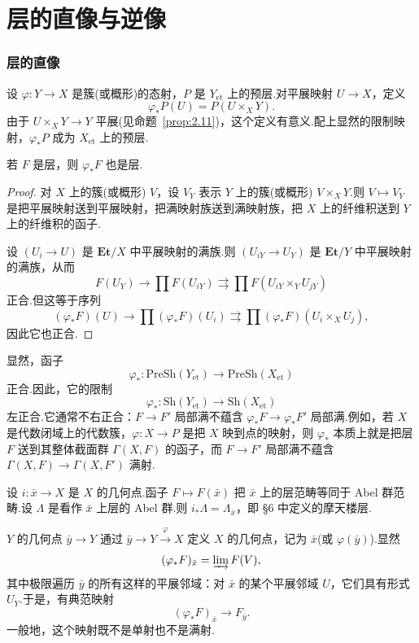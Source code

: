 ﻿%
\chapter{层的直像与逆像}\label{sec:8}

\subsection*{层的直像}

设 $\varphi \colon Y \to X$ 是簇(或概形)的态射，$P$ 是 $Y_{\mathrm{et}}$ 上的预层.对平展映射 $U \to X$，定义
\[
\varphi_{*}P(U) = P(U \times_{X} Y).
\]
由于 $U \times_{X} Y \to Y$ 平展(见命题~\ref{prop:2.11})，这个定义有意义.配上显然的限制映射，$\varphi_{*}P$ 成为 $X_{\mathrm{et}}$ 上的预层.

\begin{lemma}\label{lem:8.1}
若 $F$ 是层，则 $\varphi_{*}F$ 也是层.
\end{lemma}

\begin{proof}
对 $X$ 上的簇(或概形) $V$，设 $V_Y$ 表示 $Y$ 上的簇(或概形) $V \times_{X} Y$.则 $V \mapsto V_Y$ 是把平展映射送到平展映射，把满映射族送到满映射族，把 $X$ 上的纤维积送到 $Y$ 上的纤维积的函子.

设 $(U_i \to U)$ 是 $\mathbf{Et}/X$ 中平展映射的满族.则 $(U_{iY} \to U_Y)$ 是 $\mathbf{Et}/Y$ 中平展映射的满族，从而
\[
F(U_Y) \to \prod F(U_{iY}) \rightrightarrows \prod F(U_{iY} \times_{Y} U_{jY})
\]
正合.但这等于序列
\[
(\varphi_{*}F)(U) \to \prod (\varphi_{*}F)(U_i) \rightrightarrows \prod (\varphi_{*}F)(U_i \times_{X} U_j),
\]
因此它也正合.
\end{proof}

显然，函子
\[
\varphi_{*} \colon \mathrm{PreSh}(Y_{\mathrm{et}}) \to \mathrm{PreSh}(X_{\mathrm{et}})
\]
正合.因此，它的限制
\[
\varphi_{*} \colon \mathrm{Sh}(Y_{\mathrm{et}}) \to \mathrm{Sh}(X_{\mathrm{et}})
\]
左正合.它通常不右正合：$F \to F'$ 局部满不蕴含 $\varphi_{*}F \to \varphi_{*}F'$ 局部满.例如，若 $X$ 是代数闭域上的代数簇，$\varphi \colon X \to P$ 是把 $X$ 映到点的映射，则 $\varphi_{*}$ 本质上就是把层 $F$ 送到其整体截面群 $\Gamma(X, F)$ 的函子，而 $F \to F'$ 局部满不蕴含 $\Gamma(X, F) \to \Gamma(X, F')$ 满射.

\begin{example}\label{ex:8.2}
设 $i \colon \bar{x} \to X$ 是 $X$ 的几何点.函子 $F \mapsto F(\bar{x})$ 把 $\bar{x}$ 上的层范畴等同于 Abel 群范畴.设 $\Lambda$ 是看作 $\bar{x}$ 上层的 Abel 群.则 $i_{*}\Lambda = \Lambda_{\bar{x}}$，即 \S 6 中定义的摩天楼层.

$Y$ 的几何点 $\bar{y} \to Y$ 通过 $\bar{y} \to Y \xrightarrow{\varphi} X$ 定义 $X$ 的几何点，记为 $\bar{x}$(或 $\varphi(\bar{y})$).显然
\[
(\varphi_{*}F)_{\bar{x}} = \varinjlim F(V),
\]
其中极限遍历 $\bar{y}$ 的所有这样的平展邻域：对 $\bar{x}$ 的某个平展邻域 $U$，它们具有形式 $U_Y$.于是，有典范映射
\[
(\varphi_{*}F)_{\bar{x}} \to F_{\bar{y}}.
\]
一般地，这个映射既不是单射也不是满射.
\end{example}

